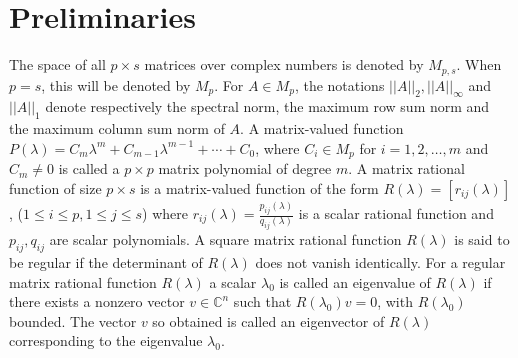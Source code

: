 \documentclass[12pt, reqno]{amsart}
\theoremstyle{definition}
\theoremstyle{remark}
\numberwithin{equation}{section}
\begin{document}
\medskip
\section{Preliminaries}\hspace*{\fill}
\label{sec-2}

The space of all $p \times s$ matrices over complex numbers is denoted by $M_{p,s}$. 
When $p=s$, this will be denoted by $M_p$. For $A \in M_p$, the notations $||A||_2, 
||A||_\infty$ and $||A||_1$ denote respectively the spectral norm, the maximum row sum norm 
and the maximum column sum norm of $A$. A matrix-valued function $P(\lambda)= C_m \lambda^m + C_{m-1}\lambda^{m-1} + \cdots +C_0$, where $C_i \in M_p$ for $i=1, 2, \ldots, m$ and 
$C_m \neq 0$ is called a $p \times p$ matrix polynomial of degree $m$. A matrix rational 
function of size $p \times s$ is a matrix-valued function of the form $R(\lambda)=[r_{ij}(\lambda)]$, ($1 \leq i \leq p, 1 \leq j \leq s$) where 
$\displaystyle r_{ij}(\lambda) = \frac{p_{ij}(\lambda)}{q_{ij}(\lambda)}$ is a scalar 
rational function and $p_{ij}, q_{ij}$ are scalar polynomials. A square matrix rational 
function $R(\lambda)$ is said to be regular if the determinant of $R(\lambda)$ does not 
vanish identically. For a regular matrix rational function $R(\lambda)$ a scalar 
$\lambda_0$ is called an eigenvalue of $R(\lambda)$ if there exists a nonzero vector 
$v \in \mathbb{C}^n$ such that $R(\lambda_0)v=0$, with $R(\lambda_0)$ bounded. The vector 
$v$ so obtained is called an eigenvector of $R(\lambda)$ corresponding to the eigenvalue 
$\lambda_0$. 
\end{document}
